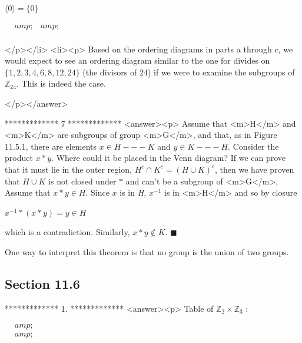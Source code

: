 \(\langle 0\rangle  = \{0\}\)

\begin{doublespace}
\noindent\(\begin{array}{lll}
  &amp;  &amp;  \\
\end{array}\)
\end{doublespace}

</p></li>
<li><p> Based on the ordering diagrams in parts a through c, we would expect to see an ordering diagram similar to the one for divides on \(\{1, 2, 3,
4, 6, 8, 12, 24\}\) (the divisors of 24) if we were to examine the subgroups of \(\mathbb{Z}_{24}\). This is indeed the case.

</p></answer>


*************
7
*************
<answer><p> Assume that <m>H</m> and <m>K</m> are subgroups of group <m>G</m>, and that, as in Figure 11.5.1, there are elements \(x \in  H --- K\)
and \(y \in  K --- H\). Consider the product \(x * y\). Where could it be placed in the Venn diagram? If we can prove that it must lie in the outer
region, \(H^c\cap K^c=(H\cup K)^c\), then we have proven that \(H \cup  K\) is not closed under \(*\) and can{'}t be a subgroup of <m>G</m>, Assume
that  \(x*y\in H\).  Since \(x\) is in \textit{ H,} \(x^{-1}\) is in <m>H</m> and so by closure



\(x^{-1}*(x * y )= y \in H\)



which is a contradiction.   Similarly, \(x*y \notin K\).  $\blacksquare $ 



One way to interpret this theorem is that no group is the union of two groups.


\subsection{Section 11.6}

*************
1.
*************
<answer><p> Table of \(\mathbb{Z}_2\times  \mathbb{Z}_3\) :

\begin{doublespace}
\noindent\(\begin{array}{cc}
 \text{} &amp;  \\
  &amp;  \\
\end{array}\)
\end{doublespace}



